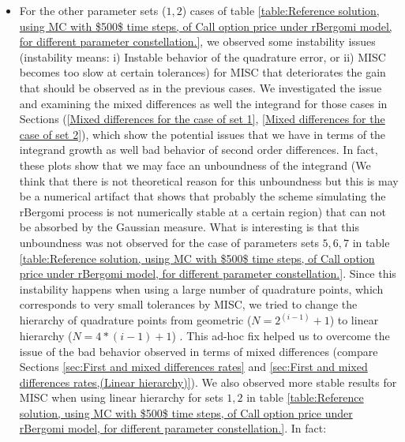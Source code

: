\documentclass[11pt]{article}
\begin{document}
\begin{itemize}
\begin{enumerate}
	\end{enumerate} 
	\item For the other parameter sets ($1,2$) cases of table \ref{table:Reference solution, using MC with $500$ time steps, of Call option price under rBergomi model, for different parameter constellation.}, we  observed some instability issues (instability means: i)  Instable behavior of the quadrature error, or  ii) MISC becomes too slow  at certain tolerances) for MISC that deteriorates the gain that should be observed as in the previous  cases.  We investigated the issue  and  examining the  mixed differences as well the integrand for those cases in Sections (\ref{Mixed differences for the case of set 1}, \ref{Mixed differences for the case of set 2}), which show the potential issues that we have in terms of the integrand growth as well bad behavior of second order differences. In fact, these plots show that we may face an unboundness of the integrand (We think that there is not theoretical reason for this  unboundness but  this is may be  a numerical artifact that shows that probably the scheme simulating the rBergomi process is not numerically stable at a certain region) that can not be absorbed by the Gaussian measure. What is interesting is that this unboundness was not observed for the case of parameters sets $5,6,7$ in table \ref{table:Reference solution, using MC with $500$ time steps, of Call option price under rBergomi model, for different parameter constellation.}. Since this instability happens when using a large number of quadrature points, which corresponds to very small tolerances by MISC, we tried to change the hierarchy of quadrature points from geometric ($N=2^{(i-1)}+1$) to linear hierarchy ($N=4*{(i-1)}+1$) . This ad-hoc fix helped us to overcome the issue of the bad behavior observed in terms of mixed differences (compare Sections \ref{sec:First and mixed differences rates} and \ref{sec:First and mixed differences rates,(Linear hierarchy)}). We also observed more stable results for MISC when using linear hierarchy for sets $1,2$ in table \ref{table:Reference solution, using MC with $500$ time steps, of Call option price under rBergomi model, for different parameter constellation.}. In fact:
	\begin{enumerate}

\end{enumerate}
\end{itemize}
\end{document}
